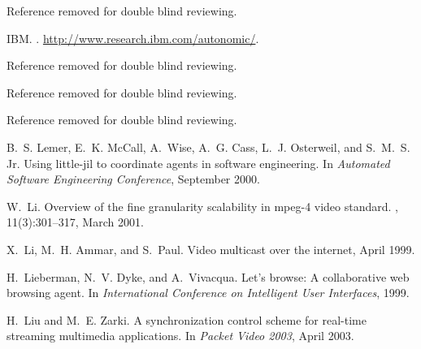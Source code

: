 \documentclass{sig-alternate}
\begin{document}
\begin{thebibliography}{10}
Reference removed for double blind reviewing.


{IBM}.
.
\newblock \url{http://www.research.ibm.com/autonomic/}.

Reference removed for double blind reviewing.

Reference removed for double blind reviewing.

Reference removed for double blind reviewing.

B.~S. Lemer, E.~K. McCall, A.~Wise, A.~G. Cass, L.~J. Osterweil, and S.~M.~S.
  Jr.
\newblock Using little-jil to coordinate agents in software engineering.
\newblock In {\em Automated Software Engineering Conference}, September 2000.

W.~Li.
\newblock Overview of the fine granularity scalability in mpeg-4 video
  standard.
,
  11(3):301--317, March 2001.

X.~Li, M.~H. Ammar, and S.~Paul.
\newblock Video multicast over the internet, April 1999.

H.~Lieberman, N.~V. Dyke, and A.~Vivacqua.
\newblock Let's browse: A collaborative web browsing agent.
\newblock In {\em International Conference on Intelligent User Interfaces},
  1999.

H.~Liu and M.~E. Zarki.
\newblock A synchronization control scheme for real-time streaming multimedia
  applications.
\newblock In {\em Packet Video 2003}, April 2003.


\end{thebibliography}
\end{document}
